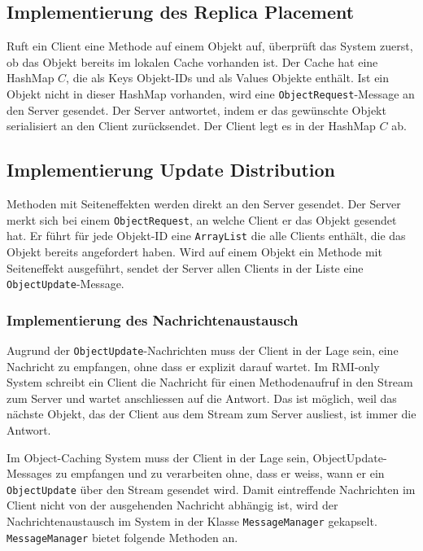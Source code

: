 \subsection{Implementierung des Replica Placement}
\label{sec:impl-des-repl-1}

Ruft ein Client eine Methode auf einem Objekt auf, überprüft das System zuerst, ob das Objekt bereits im lokalen Cache vorhanden ist. Der Cache hat eine HashMap $C$, die als Keys Objekt-IDs und als Values Objekte enthält. Ist ein Objekt nicht in dieser HashMap vorhanden, wird eine \verb+ObjectRequest+-Message an den Server gesendet. Der Server antwortet, indem er das gewünschte Objekt serialisiert an den Client zurücksendet. Der Client legt es in der HashMap $C$ ab. 

\subsection{Implementierung Update Distribution}
\label{sec:impl-update-distr}

Methoden mit Seiteneffekten werden direkt an den Server gesendet. Der Server merkt sich bei einem \verb|ObjectRequest|, an welche Client er das Objekt gesendet hat. Er führt für jede Objekt-ID eine \verb|ArrayList| die alle Clients enthält, die das Objekt bereits angefordert haben. Wird auf einem Objekt ein Methode mit Seiteneffekt ausgeführt, sendet der Server allen Clients in der Liste eine \verb|ObjectUpdate|-Message.

\subsubsection{Implementierung des Nachrichtenaustausch}
\label{sec:impl-des-nachr}

Augrund der \verb|ObjectUpdate|-Nachrichten muss der Client in der Lage sein, eine Nachricht zu empfangen, ohne dass er explizit darauf wartet. Im RMI-only System schreibt ein Client die Nachricht für einen Methodenaufruf in den Stream zum Server und wartet anschliessen auf die Antwort. Das ist möglich, weil das nächste Objekt, das der Client aus dem Stream zum Server ausliest, ist immer die Antwort.

Im Object-Caching System muss der Client in der Lage sein, Object\-Update\--Messages zu empfangen und zu verarbeiten ohne, dass er weiss, wann er ein \verb|ObjectUpdate| über den Stream gesendet wird. Damit eintreffende Nach\-richten im Client nicht von der ausgehenden Nachricht abhängig ist, wird der Nach\-richt\-enaustausch im System in der Klasse \verb|MessageManager| gekapselt. \newline \verb|MessageManager| bietet folgende Methoden an.

